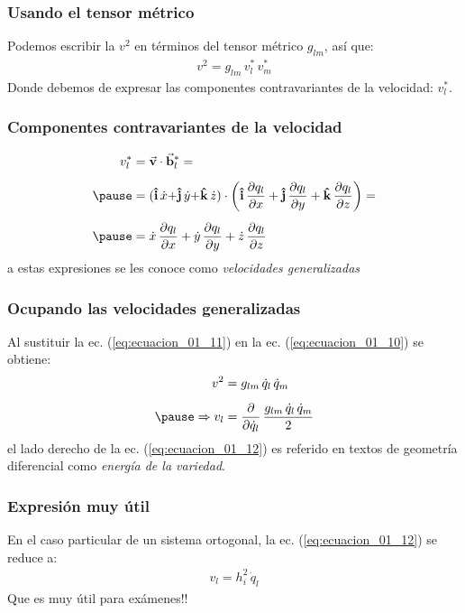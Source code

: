 \documentclass[12pt]{beamer}
\begin{document}
\begin{frame}
\frametitle{Usando el tensor métrico}
Podemos escribir la $v^{2}$ en términos del tensor métrico $g_{lm}$, así que:
\pause
\begin{align}
v^{2} = g_{lm} \, v_{l}^{*} \, v_{m}^{*}
\label{eq:ecuacion_01_10}
\end{align}
Donde debemos de expresar las componentes contravariantes de la velocidad: $v_{l}^{*}$.
\end{frame}
\begin{frame}
\frametitle{Componentes contravariantes de la velocidad}
\begin{equation}
\begin{aligned}[b]
v_{l}^{*} &= \va{v} \cdot \va{b}_{l}^{*} = \\[0.5em] \pause
&= (\vu{i} \, \dot{x} {+} \vu{j} \, \dot{y} {+} \vu{k} \, \dot{z}) \cdot \left( \vu{i} \, \pdv{q_{l}}{x} + \vu{j} \, \pdv{q_{l}}{y} + \vu{k} \, \pdv{q_{l}}{z} \right) = \\[0.5em] \pause
&= \dot{x} \, \pdv{q_{l}}{x} + \dot{y} \, \pdv{q_{l}}{y} + \dot{z} \, \pdv{q_{l}}{z}
\end{aligned}
\label{eq:ecuacion_01_11}
\end{equation}
a estas expresiones se les conoce como \emph{velocidades generalizadas}
\end{frame}
\begin{frame}
\frametitle{Ocupando las velocidades generalizadas}
Al sustituir la ec. (\ref{eq:ecuacion_01_11}) en la ec. (\ref{eq:ecuacion_01_10}) se obtiene:
\pause
\begin{equation}
\begin{aligned}[b]
v^{2} &= g_{lm} \, \dot{q}_{l} \, \dot{q}_{m} \\[0.5em] \pause
\Rightarrow v_{l} &= \pdv{\dot{q}_{l}} \, \dfrac{g_{lm} \, \dot{q}_{l} \, \dot{q}_{m}}{2}
\end{aligned}
\label{eq:ecuacion_01_12}
\end{equation} 
\pause
el lado derecho de la ec. (\ref{eq:ecuacion_01_12}) es referido en textos de geometría diferencial como \emph{energía de la variedad}.
\end{frame}
\begin{frame}
\frametitle{Expresión muy útil}
En el caso particular de un sistema ortogonal, la ec. (\ref{eq:ecuacion_01_12}) se reduce a:
\pause
\begin{align*}
v_{l} = h_{i}^{2} \, \dot{q}_{l}
\end{align*}
Que es muy útil para exámenes!!
\end{frame}
\end{document}
